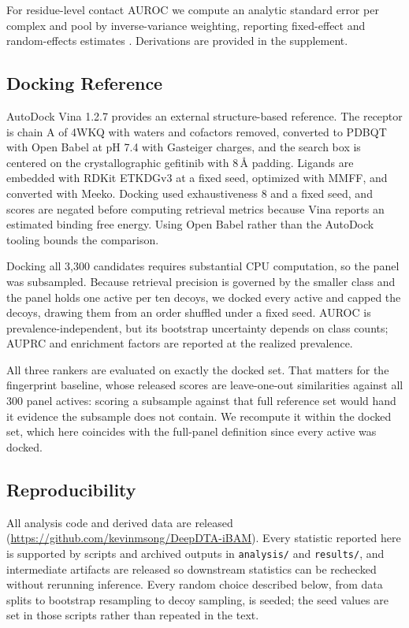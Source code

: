 \documentclass{ieeeaccess}
\begin{document}
For residue-level contact AUROC we compute an analytic standard error per
complex \cite{hanley1982auroc} and pool by inverse-variance weighting, reporting
fixed-effect and random-effects estimates \cite{dersimonian1986meta}. Derivations are provided in the supplement.

\subsection{Docking Reference}
\label{sec:dockingsetup}
AutoDock Vina 1.2.7 \cite{trott2010vina,eberhardt2021vina} provides an external
structure-based reference. The receptor is chain A of 4WKQ with waters and
cofactors removed, converted to PDBQT with Open Babel at pH 7.4 with Gasteiger
charges, and the search box is centered on the crystallographic gefitinib with
8\,\AA{} padding. Ligands are embedded with RDKit ETKDGv3 at a fixed seed,
optimized with MMFF, and converted with Meeko. Docking used exhaustiveness 8 and
a fixed seed, and scores are negated before computing retrieval metrics because
Vina reports an estimated binding free energy. Using Open Babel rather than the AutoDock
tooling bounds the comparison.

Docking all 3{,}300 candidates requires substantial CPU computation, so the panel was
subsampled. Because retrieval precision is governed by the smaller class and the
panel holds one active per ten decoys, we docked every active and capped the
decoys, drawing them from an order shuffled under a fixed seed. AUROC is
prevalence-independent, but its bootstrap uncertainty depends on class counts;
AUPRC and enrichment factors are reported at the realized prevalence.

All three rankers are evaluated on exactly the docked set. That matters for the
fingerprint baseline, whose released scores are leave-one-out similarities
against all 300 panel actives: scoring a subsample against that full reference
set would hand it evidence the subsample does not contain. We recompute it
within the docked set, which here coincides with the full-panel definition since
every active was docked.

\subsection{Reproducibility}
All analysis code and derived data are released
(\url{https://github.com/kevinmsong/DeepDTA-iBAM}). Every statistic reported
here is supported by scripts and archived outputs in \texttt{analysis/} and
\texttt{results/}, and intermediate artifacts are released so downstream
statistics can be rechecked without rerunning inference. Every random
choice described below, from data splits to bootstrap resampling to decoy
sampling, is seeded; the seed values are set in those scripts rather than
repeated in the text.
\end{document}

